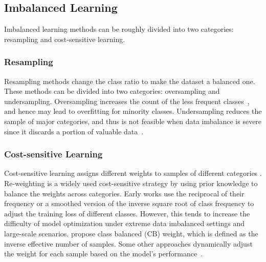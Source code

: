\subsection{Imbalanced Learning}

Imbalanced learning methods can be roughly divided into two categories: resampling and cost-sensitive learning.

\subsubsection{Resampling} Resampling methods change the class ratio to make the dataset a balanced one. These methods can be divided into two categories: oversampling and undersampling. Oversampling increases the count of the less frequent classes~\cite{chawla2002smote},
and hence may lead to overfitting for minority classes. Undersampling reduces the sample of major categories, and thus is not feasible when data imbalance is severe since it discards a portion of valuable data~\cite{liu2008exploratory}.


\subsubsection{Cost-sensitive Learning}
Cost-sensitive learning assigns different weights to samples of different categories \cite{elkan2001foundations}.
Re-weighting is a widely used cost-sensitive strategy by using prior knowledge to balance the weights across categories. Early works use the reciprocal of their frequency or a smoothed version of the inverse square root of class frequency to adjust the training loss of different classes.
However, this tends to increase the difficulty of model optimization under extreme data imbalanced settings and large-scale scenarios. \citeauthor{cui2019class}
propose class balanced (CB) weight, which is defined as the inverse effective number of samples\cite{cui2019class}. Some other approaches dynamically adjust the weight for each sample based on the model's performance~\cite{Lin_2017_ICCV, Li_Liu_Wang_2019, cao2019learning}.

